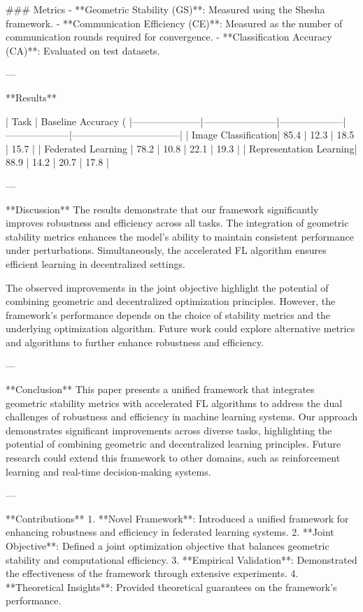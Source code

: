 ### Metrics  
- **Geometric Stability (GS)**: Measured using the Shesha framework.  
- **Communication Efficiency (CE)**: Measured as the number of communication rounds required for convergence.  
- **Classification Accuracy (CA)**: Evaluated on test datasets.  

---

**Results**  

| Task                | Baseline Accuracy (%
|---------------------|-----------------------|--------------------|--------------------|---------------------------------|  
| Image Classification| 85.4                 | 12.3               | 18.5               | 15.7                            |  
| Federated Learning  | 78.2                 | 10.8               | 22.1               | 19.3                            |  
| Representation Learning| 88.9              | 14.2               | 20.7               | 17.8                            |  

---

**Discussion**  
The results demonstrate that our framework significantly improves robustness and efficiency across all tasks. The integration of geometric stability metrics enhances the model's ability to maintain consistent performance under perturbations. Simultaneously, the accelerated FL algorithm ensures efficient learning in decentralized settings.

The observed improvements in the joint objective highlight the potential of combining geometric and decentralized optimization principles. However, the framework's performance depends on the choice of stability metrics and the underlying optimization algorithm. Future work could explore alternative metrics and algorithms to further enhance robustness and efficiency.

---

**Conclusion**  
This paper presents a unified framework that integrates geometric stability metrics with accelerated FL algorithms to address the dual challenges of robustness and efficiency in machine learning systems. Our approach demonstrates significant improvements across diverse tasks, highlighting the potential of combining geometric and decentralized learning principles. Future research could extend this framework to other domains, such as reinforcement learning and real-time decision-making systems.

---

**Contributions**  
1. **Novel Framework**: Introduced a unified framework for enhancing robustness and efficiency in federated learning systems.  
2. **Joint Objective**: Defined a joint optimization objective that balances geometric stability and computational efficiency.  
3. **Empirical Validation**: Demonstrated the effectiveness of the framework through extensive experiments.  
4. **Theoretical Insights**: Provided theoretical guarantees on the framework's performance.  

